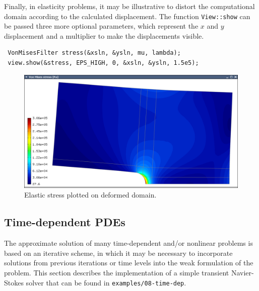 Finally, in elasticity problems, it may be illustrative to distort the computational
domain according to the calculated displacement. The function \verb"View::show" can be
passed three more optional parameters, which represent the $x$ and $y$ displacement
and a multiplier to make the displacements visible.
\begin{lstlisting}
 VonMisesFilter stress(&xsln, &ysln, mu, lambda);
 view.show(&stress, EPS_HIGH, 0, &xsln, &ysln, 1.5e5);
\end{lstlisting}


\begin{figure}[ht]
  \medskip \centering
  \includegraphics[width=\textwidth]{img/mises.png}
  \caption{Elastic stress plotted on deformed domain.}
  \label{elastsln}
\end{figure}



\subsection{Time-dependent PDEs}

The approximate solution of many time-dependent and/or nonlinear problems is based on
an iterative scheme, in which it may be necessary to incorporate solutions from 
previous iterations or time levels into the weak formulation of the problem.
This section describes the implementation of a simple transient Navier-Stokes solver
that can be found in {\tt examples/08-time-dep}.

